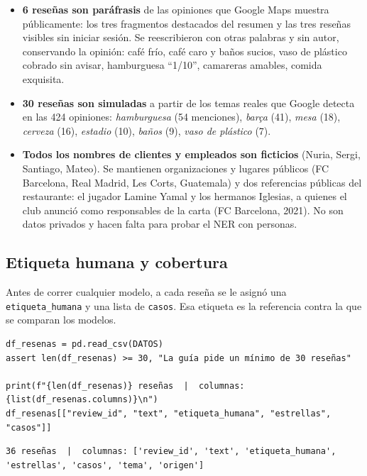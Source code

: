 \documentclass[12pt,a4paper]{article}
\begin{document}
\begin{itemize}[leftmargin=1.2em]
\item \textbf{6 reseñas son paráfrasis} de las opiniones que Google Maps muestra públicamente:
los tres fragmentos destacados del resumen y las tres reseñas visibles sin iniciar sesión. Se
reescribieron con otras palabras y sin autor, conservando la opinión: café frío, café caro y
baños sucios, vaso de plástico cobrado sin avisar, hamburguesa ``1/10'', camareras amables,
comida exquisita.
\item \textbf{30 reseñas son simuladas} a partir de los temas reales que Google detecta en las 424
opiniones: \emph{hamburguesa} (54 menciones), \emph{barça} (41), \emph{mesa} (18),
\emph{cerveza} (16), \emph{estadio} (10), \emph{baños} (9), \emph{vaso de plástico} (7).
\item \textbf{Todos los nombres de clientes y empleados son ficticios} (Nuria, Sergi, Santiago,
Mateo). Se mantienen organizaciones y lugares públicos (FC Barcelona, Real Madrid, Les Corts,
Guatemala) y dos referencias públicas del restaurante: el jugador Lamine Yamal y los hermanos
Iglesias, a quienes el club anunció como responsables de la carta (FC Barcelona, 2021). No son
datos privados y hacen falta para probar el NER con personas.
\end{itemize}

\subsection{Etiqueta humana y cobertura}

Antes de correr cualquier modelo, a cada reseña se le asignó una \texttt{etiqueta\_humana} y una
lista de \texttt{casos}. Esa etiqueta es la referencia contra la que se comparan los modelos.

\begin{lstlisting}[style=codigo]
df_resenas = pd.read_csv(DATOS)
assert len(df_resenas) >= 30, "La guía pide un mínimo de 30 reseñas"

print(f"{len(df_resenas)} reseñas  |  columnas: {list(df_resenas.columns)}\n")
df_resenas[["review_id", "text", "etiqueta_humana", "estrellas", "casos"]]
\end{lstlisting}

\begin{lstlisting}[style=salida]
36 reseñas  |  columnas: ['review_id', 'text', 'etiqueta_humana', 'estrellas', 'casos', 'tema', 'origen']
\end{lstlisting}
\end{document}
